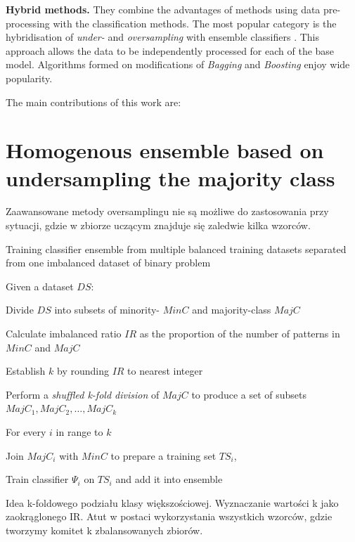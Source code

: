 \documentclass[pmlr]{jmlr}
\begin{document}
\noindent\textbf{Hybrid methods.} They combine the advantages of methods using data pre-processing with the classification methods. The most popular category is the hybridisation of \emph{under-} and \emph{oversampling} with ensemble classifiers \cite{Galar:2012}. This approach allows the data to be independently  processed for each of the base model. Algorithms formed on modifications of \emph{Bagging} and \emph{Boosting} \cite{Chawla:2003} enjoy wide popularity.

The main contributions of this work are:

\section{Homogenous ensemble based on undersampling the majority class}
\label{sec:intro}

Zaawansowane metody oversamplingu nie są możliwe do zastosowania przy sytuacji, gdzie w zbiorze uczącym znajduje się zaledwie kilka wzorców.

\begin{algorithm}
\caption{Training classifier ensemble from multiple balanced training datasets separated from one imbalanced dataset of binary problem}\label{alg:moore}
Given a dataset $DS$:
\begin{enumerate*}
	\item Divide $DS$ into subsets of minority- $MinC$ and majority-class $MajC$
	\item Calculate imbalanced ratio $IR$ as the proportion of the number of patterns in $MinC$ and $MajC$ 
	\item Establish $k$ by rounding $IR$ to nearest integer
	\item Perform a \emph{shuffled k-fold division} of $MajC$ to produce a set of subsets $MajC_1, MajC_2, \ldots, MajC_k$ 
	\item For every $i$ in range to $k$
	\begin{enumerate*}
		\item Join $MajC_i$ with $MinC$ to prepare a training set $TS_i$,
		\item Train classifier $\Psi_i$ on $TS_i$ and add it into ensemble
	\end{enumerate*}
\end{enumerate*}
\end{algorithm}

Idea k-foldowego podziału klasy większościowej. Wyznaczanie wartości k jako zaokrąglonego IR. Atut w postaci wykorzystania wszystkich wzorców, gdzie tworzymy komitet k zbalansowanych zbiorów.
\end{document}

